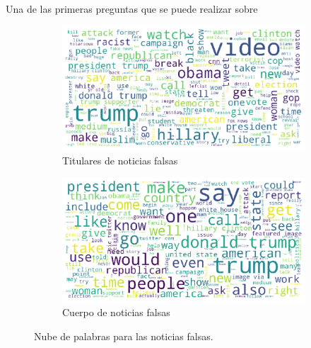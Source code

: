 {Una de las primeras preguntas que se puede realizar sobre
\begin{figure}
\centering
\begin{subfigure}{\escala\textwidth}
    \centering
    \includegraphics[width=\textwidth]{imagenes/wordcloud_titulares_falsas.pdf}
    \caption{Titulares de noticias falsas}
    \label{fig:tit-fake}
\end{subfigure}%
\newline
\begin{subfigure}{\escala\textwidth}
    \centering
    \includegraphics[width=\textwidth]{imagenes/wordclouds_cuerpo_falsas.pdf}
    \caption{Cuerpo de noticias falsas}
    \label{fig:text-fake}
\end{subfigure}
\caption{Nube de palabras para las noticias falsas.}
\label{fig:fake}
\end{figure}

}
